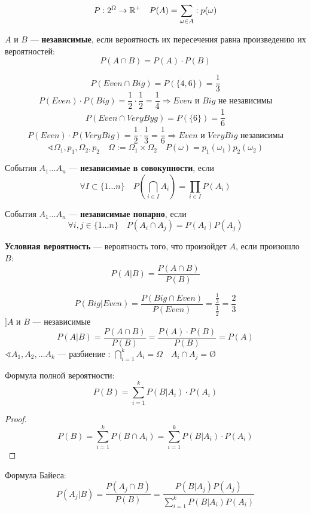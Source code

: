 $$P:2^\Omega \to \mathbb{R}^+ \quad P(A) = \sum\limits_{\omega \in A}: p(\omega)$$
\begin{definition}
    $A$ и $B$ --- \textbf{независимые}, если вероятность их пересечения равна произведению их вероятностей:
    $$P(A\cap B)=P(A)\cdot P(B)$$
\end{definition}
$$P(Even \cap Big) = P(\{4, 6\}) = \frac{1}{3}$$
$$P(Even) \cdot P(Big) = \frac{1}{2} \cdot \frac{1}{2} = \frac{1}{4} \Rightarrow Even \text{ и } Big \text{ не независимы}$$
$$P(Even \cap VeryByg) = P(\{6\}) = \frac{1}{6}$$
$$P(Even) \cdot P(VeryBig) = \frac{1}{2} \cdot \frac{1}{3} = \frac{1}{6} \Rightarrow Even \text{ и } VeryBig \text{ независимы}$$
$$\sphericalangle \Omega_1, p_1, \Omega_2, p_2 \quad \Omega := \Omega_1 \times \Omega_2 \quad P(\omega)=p_1(\omega_1)p_2(\omega_2)$$
\begin{definition}
    События $A_1\ldots A_n$ --- \textbf{независимые в совокупности}, если
    $$\forall I\subset\{1\ldots n\} \quad P\left(\bigcap\limits_{i\in I} A_i\right)=\prod\limits_{i\in I}P(A_i)$$
\end{definition}
\begin{definition}
    События $A_1\ldots A_n$ --- \textbf{независимые попарно}, если
    $$\forall i, j\in\{1\ldots n\} \quad P(A_i\cap A_j)=P(A_i)P(A_j)$$
\end{definition}
\begin{definition}
    \textbf{Условная вероятность} --- вероятность того, что произойдет $A$, если произошло $B$:
    $$P(A|B)=\frac{P(A\cap B)}{P(B)}$$
\end{definition}
$$P(Big|Even) = \frac{P(Big \cap Even)}{P(Even)} = \frac{\frac{1}{3}}{\frac{1}{2}} = \frac{2}{3}$$
$] A$ и $B$ --- независимые
$$P(A|B) = \frac{P(A \cap B)}{P(B)} = \frac{P(A)\cdot P(B)}{P(B)} = P(A)$$
$\sphericalangle A_1, A_2, \ldots A_k$ --- разбиение : $\bigcap\limits_{i=1}^k A_i=\Omega \quad A_i\cap A_j=\text{\O}$
\begin{theorem}
    Формула полной вероятности:
    $$P(B)=\sum\limits_{i=1}^k P(B|A_i)\cdot P(A_i)$$
\end{theorem}
\begin{proof}
    $$P(B)=\sum\limits_{i=1}^k P(B\cap A_i)=\sum\limits_{i=1}^k P(B|A_i)\cdot P(A_i)$$
\end{proof}
\begin{theorem}
    Формула Байеса:
    $$P(A_j|B)=\frac{P(A_j\cap B)}{P(B)}=\frac{P(B|A_j)P(A_j)}{\sum\limits_{i=1}^k P(B|A_i)P(A_i)}$$
\end{theorem}

